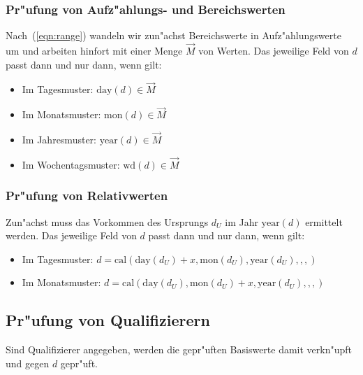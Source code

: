 \documentclass[a4paper]{article}
\newcommand*{\dayf}{\mathrm{day}}
\newcommand*{\monf}{\mathrm{mon}}
\newcommand*{\yearf}{\mathrm{year}}
\newcommand*{\wdf}{\mathrm{wd}}
\newcommand*{\calf}{\mathrm{cal}}
\numberwithin{equation}{section}
\begin{document}
\subsubsection{Pr"ufung von Aufz"ahlungs- und Bereichswerten}
Nach~(\ref{eqn:range}) wandeln wir zun"achst Bereichswerte in Aufz"ahlungswerte
um und arbeiten hinfort mit einer Menge $\vec{M}$ von Werten. Das jeweilige Feld
von $d$ passt dann und nur dann, wenn gilt:
\begin{itemize}
\item Im Tagesmuster: $\dayf(d) \in \vec{M}$
\item Im Monatsmuster: $\monf(d) \in \vec{M}$
\item Im Jahresmuster: $\yearf(d) \in \vec{M}$
\item Im Wochentagsmuster: $\wdf(d) \in \vec{M}$
\end{itemize}

\subsubsection{Pr"ufung von Relativwerten}
Zun"achst muss das Vorkommen des Ursprungs $d_U$ im Jahr $\yearf(d)$ ermittelt
werden. Das jeweilige Feld von $d$ passt dann und nur dann, wenn gilt:
\begin{itemize}
\item Im Tagesmuster: $d = \calf(\dayf(d_U) + x, \monf(d_U), \yearf(d_U), , ,)$
\item Im Monatsmuster: $d = \calf(\dayf(d_U), \monf(d_U) + x, \yearf(d_U), , ,)$
\end{itemize}


\subsection{Pr"ufung von Qualifizierern}
Sind Qualifizierer angegeben, werden die gepr"uften Basiswerte damit verkn"upft
und gegen $d$ gepr"uft.
\end{document}
